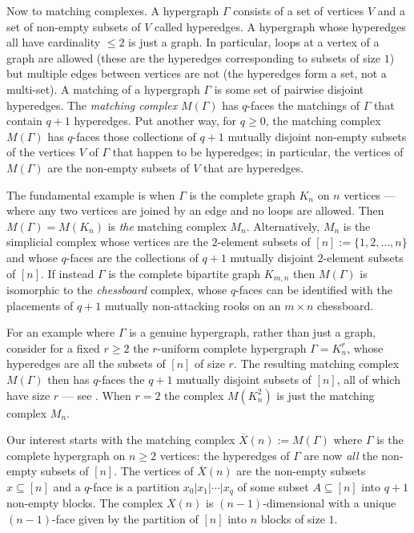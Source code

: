 \documentclass[matann2]{svjour1}
\def\ov{\overline}
\begin{document}
Now to matching complexes.
A hypergraph $\Gamma$ consists of a set of vertices $V$ and a
set of non-empty subsets of $V$ called hyperedges. 
A hypergraph whose hyperedges all have cardinality $\leq 2$ is just a
graph. In particular,
loops at a vertex of a graph are allowed (these are the hyperedges
corresponding to subsets of size $1$)
but multiple edges between
vertices are not (the hyperedges form a set, not a multi-set).
A matching of a hypergraph
$\Gamma$ is some set of pairwise disjoint hyperedges. 
The \emph{matching
complex\/} $M(\Gamma)$ has $q$-faces the matchings of $\Gamma$ that
contain $q+1$ hyperedges. 
Put another way, for $q\geq 0$, the matching complex $M(\Gamma)$ 
has $q$-faces those collections of $q+1$ mutually disjoint 
non-empty subsets of
the vertices $V$ of $\Gamma$ that happen to be hyperedges;
in particular, the vertices of $M(\Gamma)$ are
the non-empty subsets of $V$ that are hyperedges.

\vspace{1em}

The fundamental example is when
$\Gamma$ is the complete graph $K_n$ on $n$ vertices --- where any
two vertices are joined by an edge and no loops are allowed. Then
$M(\Gamma)=M(K_n)$ is \emph{the\/} matching complex
$M_n$. Alternatively, $M_n$
is the simplicial complex whose vertices are the $2$-element subsets
of $[n]:=\{1,2,\ldots,n\}$ and whose 
$q$-faces are the collections of $q+1$ mutually disjoint $2$-element
subsets of $[n]$. 
If instead $\Gamma$ is the complete bipartite graph $K_{m,n}$
then $M(\Gamma)$ is isomorphic to the \emph{chessboard\/} complex,
whose $q$-faces 
can be identified with 
the placements of $q+1$ mutually non-attacking rooks on an
$m\times n$ chessboard.

For an example where $\Gamma$ is a genuine
hypergraph, rather than just a graph, consider
for a fixed $r\geq 2$ the 
$r$-uniform complete 
hypergraph
$\Gamma=K_n^r$, whose hyperedges are all the subsets 
of $[n]$ of size $r$. The
resulting matching complex $M(\Gamma)$ then 
has $q$-faces the $q+1$ mutually disjoint subsets of $[n]$, all of
which have size $r$ --- see \cite{MR1253009}.
When $r=2$ the complex $M(K_n^2)$ is just the
matching complex $M_n$.

\vspace{1em}

Our interest starts with the matching complex $\overline{X}(n):=M(\Gamma)$
where 
$\Gamma$ is 
the complete hypergraph on $n\geq 2$ vertices: 
the hyperedges of $\Gamma$ are now
\emph{all\/} the
non-empty subsets of $[n]$.
The vertices of $\overline{X}(n)$ are the non-empty subsets
$x\subseteq [n]$ and
a $q$-face is a partition $x_0|x_1|\cdots|x_q$ of some subset
$A\subseteq [n]$ into $q+1$ non-empty blocks.
The complex $\ov{X}(n)$ is $(n-1)$-dimensional with a unique $(n-1)$-face
given by the partition of $[n]$ into $n$ blocks of size $1$. 
\end{document}
